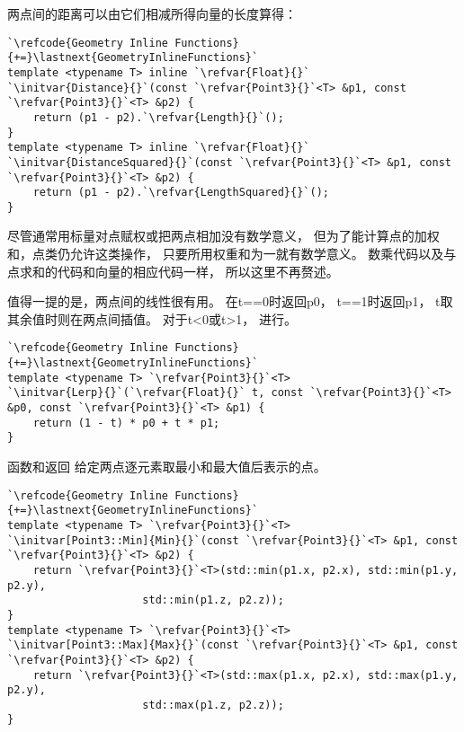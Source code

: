 两点间的距离可以由它们相减所得向量的长度算得：
\begin{lstlisting}
`\refcode{Geometry Inline Functions}{+=}\lastnext{GeometryInlineFunctions}`
template <typename T> inline `\refvar{Float}{}`
`\initvar{Distance}{}`(const `\refvar{Point3}{}`<T> &p1, const `\refvar{Point3}{}`<T> &p2) {
    return (p1 - p2).`\refvar{Length}{}`();
}
template <typename T> inline `\refvar{Float}{}`
`\initvar{DistanceSquared}{}`(const `\refvar{Point3}{}`<T> &p1, const `\refvar{Point3}{}`<T> &p2) {
    return (p1 - p2).`\refvar{LengthSquared}{}`();
}
\end{lstlisting}

尽管通常用标量对点赋权或把两点相加没有数学意义，
但为了能计算点的加权和，点类仍允许这类操作，
只要所用权重和为一就有数学意义。
数乘代码以及与点求和的代码和向量的相应代码一样，
所以这里不再赘述。

值得一提的是，两点间的线性很有用。
在{\ttfamily t==0}时返回{\ttfamily p0}，
{\ttfamily t==1}时返回{\ttfamily p1}，
{\ttfamily t}取其余值时则在两点间插值。
对于{\ttfamily t<0}或{\ttfamily t>1}，
进行。
\begin{lstlisting}
`\refcode{Geometry Inline Functions}{+=}\lastnext{GeometryInlineFunctions}`
template <typename T> `\refvar{Point3}{}`<T>
`\initvar{Lerp}{}`(`\refvar{Float}{}` t, const `\refvar{Point3}{}`<T> &p0, const `\refvar{Point3}{}`<T> &p1) {
    return (1 - t) * p0 + t * p1;
}
\end{lstlisting}

函数和返回
给定两点逐元素取最小和最大值后表示的点。
\begin{lstlisting}
`\refcode{Geometry Inline Functions}{+=}\lastnext{GeometryInlineFunctions}`
template <typename T> `\refvar{Point3}{}`<T>
`\initvar[Point3::Min]{Min}{}`(const `\refvar{Point3}{}`<T> &p1, const `\refvar{Point3}{}`<T> &p2) {
    return `\refvar{Point3}{}`<T>(std::min(p1.x, p2.x), std::min(p1.y, p2.y), 
                     std::min(p1.z, p2.z));
}
template <typename T> `\refvar{Point3}{}`<T>
`\initvar[Point3::Max]{Max}{}`(const `\refvar{Point3}{}`<T> &p1, const `\refvar{Point3}{}`<T> &p2) {
    return `\refvar{Point3}{}`<T>(std::max(p1.x, p2.x), std::max(p1.y, p2.y), 
                     std::max(p1.z, p2.z));
}
\end{lstlisting}

